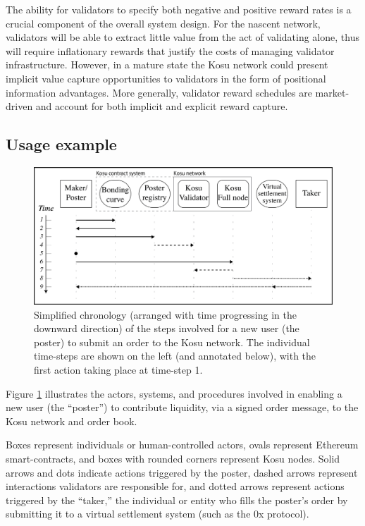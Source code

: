 \documentclass[10pt]{article}
\begin{document}
The ability for validators to specify both negative and positive reward rates is a crucial component of the overall system design. For the nascent network, validators will be able to extract little value from the act of validating alone, thus will require inflationary rewards that justify the costs of managing validator infrastructure. However, in a mature state the Kosu network could present implicit value capture opportunities to validators in the form of positional information advantages. More generally, validator reward schedules are market-driven and account for both implicit and explicit reward capture.

\clearpage
\pagebreak
\subsection{Usage example}\label{overview-example}
\begin{figure}[H]
  \centering
  \includegraphics[width=\textwidth]{../figures/fig2.png}
  \caption{Simplified chronology (arranged with time progressing in the downward direction) of the steps involved for a new user (the poster) to submit an order to the Kosu network. The individual time-steps are shown on the left (and annotated below), with the first action taking place at time-step 1.}
  \label{fig:fig1}
\end{figure}
Figure \ref{fig:fig1} illustrates the actors, systems, and procedures involved in enabling a new user (the ``poster'') to contribute liquidity, via a signed order message, to the Kosu network and order book. 
\medskip

Boxes represent individuals or human-controlled actors, ovals represent Ethereum smart-contracts, and boxes with rounded corners represent Kosu nodes. Solid arrows and dots indicate actions triggered by the poster, dashed arrows represent interactions validators are responsible for, and dotted arrows represent actions triggered by the ``taker,'' the individual or entity who fills the poster's order by submitting it to a virtual settlement system (such as the 0x protocol\cite{0x-wp}).
\medskip
\end{document}
